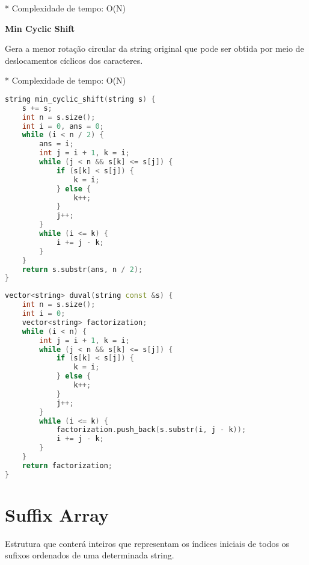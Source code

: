 \documentclass[11pt, a4paper, oneside]{book}
\begin{document}
* Complexidade de tempo: O(N)



\textbf{Min Cyclic Shift} 



Gera a menor rotação circular da string original que pode ser obtida por meio de deslocamentos cíclicos dos caracteres.



* Complexidade de tempo: O(N)



\hfill

\begin{multicols}{2}
\begin{lstlisting}[language=C++]
string min_cyclic_shift(string s) {
    s += s;
    int n = s.size();
    int i = 0, ans = 0;
    while (i < n / 2) {
        ans = i;
        int j = i + 1, k = i;
        while (j < n && s[k] <= s[j]) {
            if (s[k] < s[j]) {
                k = i;
            } else {
                k++;
            }
            j++;
        }
        while (i <= k) {
            i += j - k;
        }
    }
    return s.substr(ans, n / 2);
}
\end{lstlisting}
\end{multicols}

\hfill

\begin{multicols}{2}
\begin{lstlisting}[language=C++]
vector<string> duval(string const &s) {
    int n = s.size();
    int i = 0;
    vector<string> factorization;
    while (i < n) {
        int j = i + 1, k = i;
        while (j < n && s[k] <= s[j]) {
            if (s[k] < s[j]) {
                k = i;
            } else {
                k++;
            }
            j++;
        }
        while (i <= k) {
            factorization.push_back(s.substr(i, j - k));
            i += j - k;
        }
    }
    return factorization;
}
\end{lstlisting}
\end{multicols}

\hfill

\section{Suffix Array}


Estrutura que conterá inteiros que representam os índices iniciais de todos os sufixos ordenados de uma determinada string.
\end{document}
